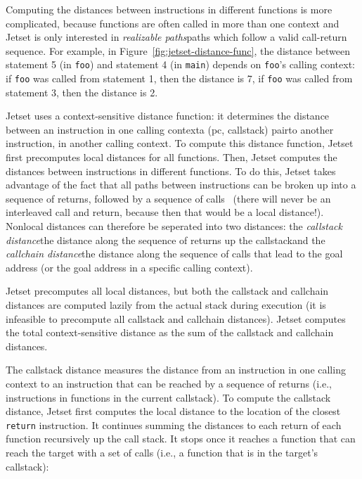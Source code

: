 Computing the distances between instructions in different functions is more complicated, because functions are often called in more than one context and Jetset is only interested in \textit{realizable paths}\textemdash paths which follow a valid call-return sequence.
For example, in Figure~\ref{fig:jetset-distance-func}, the distance between statement 5 (in \texttt{foo}) and statement 4 (in \texttt{main}) depends on \texttt{foo}'s calling context: if \texttt{foo} was called from statement 1, then the distance is 7, if \texttt{foo} was called from statement 3, then the distance is 2.

Jetset uses a context-sensitive distance function: it determines the distance between an instruction in one calling context\textemdash a (pc, callstack) pair\textemdash to another instruction, in another calling context.
To compute this distance function, Jetset first precomputes local distances for all functions.
Then, Jetset computes the distances between instructions in different functions.
To do this, Jetset takes advantage of the fact that all paths between instructions can be broken up into a sequence of returns, followed by a sequence of calls~\cite{directedsymex} (there will never be an interleaved call and return, because then that would be a local distance!).
Nonlocal distances can therefore be seperated into two distances: the \textit{callstack distance}\textemdash the distance along the sequence of returns up the callstack\textemdash and the \textit{callchain distance}\textemdash the distance along the sequence of calls that lead to the goal address (or the goal address in a specific calling context).

Jetset precomputes all local distances, but both the callstack and callchain distances are computed lazily from the actual stack during execution (it is infeasible to precompute all callstack and callchain distances).
Jetset computes the total context-sensitive distance as the sum of the callstack and callchain distances.

The callstack distance measures the distance from an instruction in one calling context to an instruction that can be reached by a sequence of returns (i.e., instructions in functions in the current callstack).
To compute the callstack distance, Jetset first computes the local distance to the location of the closest \texttt{return} instruction.
It continues summing the distances to each return of each function recursively up the call stack.
It stops once it reaches a function that can reach the target with a set of calls (i.e., a function that is in the target's callstack):

